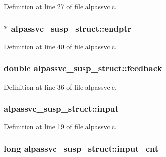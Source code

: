 Definition at line 27 of file alpassvc.\+c.

\subsubsection[{\texorpdfstring{endptr}{endptr}}]{$\ast$ alpassvc\+\_\+susp\+\_\+struct\+::endptr}\hypertarget{structalpassvc__susp__struct_a71c5cccc58d0908a8fd9eb3d541f153f}{}\label{structalpassvc__susp__struct_a71c5cccc58d0908a8fd9eb3d541f153f}


Definition at line 40 of file alpassvc.\+c.

\subsubsection[{\texorpdfstring{feedback}{feedback}}]{\setlength{\rightskip}{0pt plus 5cm}double alpassvc\+\_\+susp\+\_\+struct\+::feedback}\hypertarget{structalpassvc__susp__struct_a294289fc3fd4d90aebae21ff51375e2b}{}\label{structalpassvc__susp__struct_a294289fc3fd4d90aebae21ff51375e2b}


Definition at line 36 of file alpassvc.\+c.

\subsubsection[{\texorpdfstring{input}{input}}]{ alpassvc\+\_\+susp\+\_\+struct\+::input}\hypertarget{structalpassvc__susp__struct_a70eda65885d15c88c119725c4bcb9a00}{}\label{structalpassvc__susp__struct_a70eda65885d15c88c119725c4bcb9a00}


Definition at line 19 of file alpassvc.\+c.

\subsubsection[{\texorpdfstring{input\+\_\+cnt}{input_cnt}}]{\setlength{\rightskip}{0pt plus 5cm}long alpassvc\+\_\+susp\+\_\+struct\+::input\+\_\+cnt}\hypertarget{structalpassvc__susp__struct_a681be947a96f2985a2313f4eb35eac67}{}\label{structalpassvc__susp__struct_a681be947a96f2985a2313f4eb35eac67}


